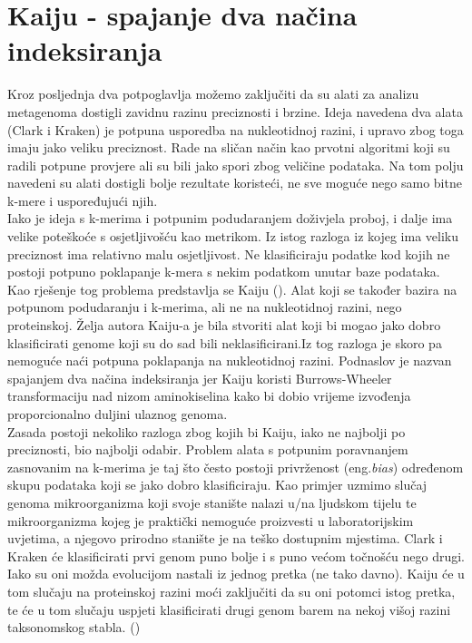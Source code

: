 \documentclass[times, utf8, seminar]{fer}
\begin{document}
\section{Kaiju - spajanje dva načina indeksiranja}
Kroz posljednja dva potpoglavlja možemo zaključiti da su alati za analizu metagenoma dostigli zavidnu razinu preciznosti i brzine. Ideja navedena dva alata (Clark i Kraken) je potpuna usporedba na nukleotidnoj razini, i upravo zbog toga imaju jako veliku preciznost. Rade na sličan način kao prvotni algoritmi koji su radili potpune provjere ali su bili jako spori zbog veličine podataka. Na tom polju navedeni su alati dostigli bolje rezultate koristeći, ne sve moguće nego samo bitne k-mere i uspoređujući njih.
\\Iako je ideja s k-merima i potpunim podudaranjem doživjela proboj, i dalje ima velike poteškoće s osjetljivošću kao metrikom. Iz istog razloga iz kojeg ima veliku preciznost ima relativno malu osjetljivost. Ne klasificiraju podatke kod kojih ne postoji potpuno poklapanje k-mera s nekim podatkom unutar baze podataka.
\\Kao rješenje tog problema predstavlja se Kaiju (\cite{Kaiju}). Alat koji se također bazira na potpunom podudaranju i k-merima, ali ne na nukleotidnoj razini, nego proteinskoj. Želja autora Kaiju-a je bila stvoriti alat koji bi mogao jako dobro klasificirati genome koji su do sad bili neklasificirani.Iz tog razloga je skoro pa nemoguće naći potpuna poklapanja na nukleotidnoj razini. Podnaslov je nazvan spajanjem dva načina indeksiranja jer Kaiju koristi Burrows-Wheeler transformaciju nad nizom aminokiselina kako bi dobio vrijeme izvođenja proporcionalno duljini ulaznog genoma.
\\Zasada postoji nekoliko razloga zbog kojih bi Kaiju, iako ne najbolji po preciznosti, bio najbolji odabir. Problem alata s potpunim poravnanjem zasnovanim na k-merima je taj što često postoji privrženost (eng.\textit{bias}) određenom skupu podataka koji se jako dobro klasificiraju. Kao primjer uzmimo slučaj genoma mikroorganizma koji svoje stanište nalazi u/na ljudskom tijelu te mikroorganizma kojeg je praktički nemoguće proizvesti u laboratorijskim uvjetima, a njegovo prirodno stanište je na teško dostupnim mjestima. Clark i Kraken će klasificirati prvi genom puno bolje i s puno većom točnošću nego drugi. Iako su oni možda evolucijom nastali iz jednog pretka (ne tako davno). Kaiju će u tom slučaju na proteinskoj razini moći zaključiti da su oni potomci istog pretka, te će u tom slučaju uspjeti klasificirati drugi genom barem na nekoj višoj razini taksonomskog stabla. (\cite{Kaiju})
\end{document}
